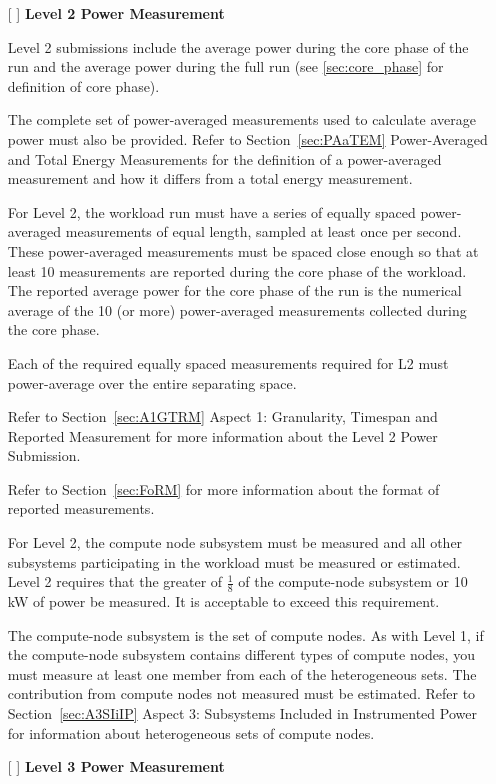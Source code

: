 \begin{itemize}
\newpage
\item[{[ ]}]
\textbf{Level 2 Power Measurement}

Level 2 submissions include the average power during the core phase of the run and the average power during the full run (see \ref{sec:core_phase} for definition of core phase).

The complete set of power-averaged measurements used to calculate average power must also be provided. 
Refer to Section~\ref{sec:PAaTEM} Power-Averaged and Total Energy Measurements for the definition of a power-averaged
measurement and how it differs from a total energy measurement.

For Level 2, the workload run must have a series of equally spaced power-averaged measurements of equal length, sampled at least once per second.
These power-averaged measurements must be spaced close enough so that at least 10 measurements are reported during the
core phase of the workload. The reported average power for the core phase of the run is the numerical average of the
10 (or more) power-averaged measurements collected during the core phase.

Each of the required equally spaced measurements required for L2 must power-average over the entire separating space. 

Refer to Section~\ref{sec:A1GTRM} Aspect 1: Granularity, Timespan and Reported Measurement for more information about the Level 2 Power Submission. 

Refer to Section~\ref{sec:FoRM} for more information about the format of reported measurements.

For Level 2, the compute node subsystem must be measured and all other subsystems participating in the workload must be measured or estimated. Level 2 requires that the 
greater of $ \frac{1}{8} $ of the compute-node subsystem or 10 kW of power be measured. It is acceptable to exceed this requirement.

The compute-node subsystem is the set of compute nodes. As with Level 1, if the compute-node subsystem contains different types of compute nodes, you must measure at least one member from each of the heterogeneous sets. The contribution from compute nodes not measured must be estimated. Refer to Section~\ref{sec:A3SIiIP} Aspect 3: Subsystems Included in Instrumented Power for information about heterogeneous sets of compute nodes.

\newpage
\item[{[ ]}]
\textbf{Level 3 Power Measurement}


\end{itemize}
